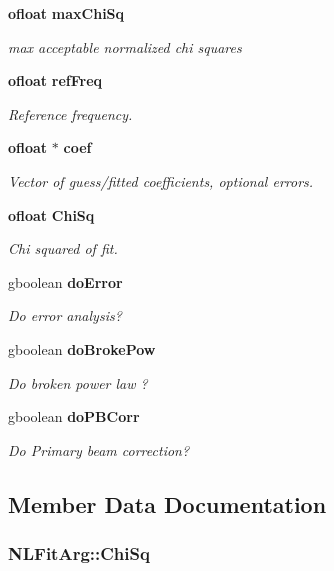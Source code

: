 \begin{CompactItemize}
{\bf ofloat} {\bf max\-Chi\-Sq}
\begin{CompactList}\small\item\em max acceptable normalized chi squares \item\end{CompactList}\item 
{\bf ofloat} {\bf ref\-Freq}
\begin{CompactList}\small\item\em Reference frequency. \item\end{CompactList}\item 
{\bf ofloat} $\ast$ {\bf coef}
\begin{CompactList}\small\item\em Vector of guess/fitted coefficients, optional errors. \item\end{CompactList}\item 
{\bf ofloat} {\bf Chi\-Sq}
\begin{CompactList}\small\item\em Chi squared of fit. \item\end{CompactList}\item 
gboolean {\bf do\-Error}
\begin{CompactList}\small\item\em Do error analysis? \item\end{CompactList}\item 
gboolean {\bf do\-Broke\-Pow}
\begin{CompactList}\small\item\em Do broken power law ? \item\end{CompactList}\item 
gboolean {\bf do\-PBCorr}
\begin{CompactList}\small\item\em Do Primary beam correction? \item\end{CompactList}\end{CompactItemize}


\subsection{Member Data Documentation}
\subsubsection{ {\bf NLFit\-Arg::Chi\-Sq}}\label{structNLFitArg_o18}


